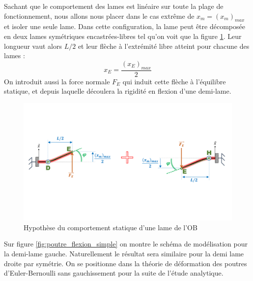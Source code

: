 Sachant que le comportement des lames est linéaire sur toute la plage de fonctionnement, nous allons nous placer dans le cas extrême de $x_m = (x_m)_{max}$ et isoler une seule lame. Dans cette configuration, la lame peut être décomposée en deux lames symétriques encastrées-libres tel qu'on voit que la figure \ref{fig:OB_surbrillance_2_lames}. Leur longueur vaut alors $L/2$ et leur flèche à l'extrémité libre atteint pour chacune des lames :
\begin{equation}
		x_E =\frac{(x_E)_{max}}{2}
\label{eq:x_E=x_max/2}
\end{equation}
On introduit aussi la force normale $F_E$ qui induit cette flèche à l'équilibre statique, et depuis laquelle découlera la rigidité en flexion d'une demi-lame.\\
\begin{figure}[!htbp]
\begin{center}
    \captionsetup{justification=centering}
	\includegraphics[trim={0cm 6cm 1cm 5cm},clip, width=\textwidth]{../Chap3/Figure/OB_surbrillance_2_lames.pdf}
	\caption{Hypothèse du comportement statique d'une lame de l'OB}
	\label{fig:OB_surbrillance_2_lames}
\end{center}
\end{figure}
Sur figure \ref{fig:poutre_flexion_simple} on montre le schéma de modélisation pour la demi-lame gauche. Naturellement le résultat sera similaire pour la demi lame droite par symétrie. On se positionne dans la théorie de déformation des poutres d'Euler-Bernoulli sans gauchissement pour la suite de l'étude analytique. 
